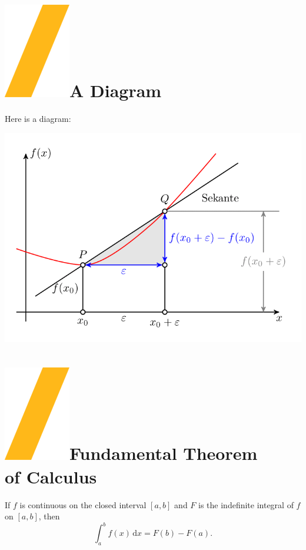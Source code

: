 \documentclass[a0paper,fleqn]{src/betterposter}
\begin{document}
{\section{\includegraphics[height=\fontcharht\font`\S]{img/general/slash.png}A Diagram}
Here is a diagram:
\begin{center}
\includegraphics[width=\textwidth]{img/example/tikzexample1}
\end{center}

\section{\includegraphics[height=\fontcharht\font`\S]{img/general/slash.png}Fundamental Theorem\\of Calculus}
If $f$ is continuous on the closed interval $[a,b]$ and $F$ is the indefinite integral of $f$ on $[a,b]$, then
\begin{equation}
\int_a^b f(x)\,\mathrm{d}x = F(b)-F(a).
\end{equation}

}
\end{document}
